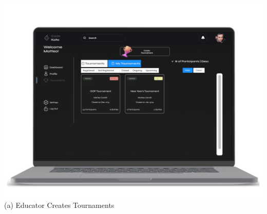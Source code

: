 \begin{center}
\includegraphics[scale=0.13]{Images/ui-ux/educator_create_tournament/educator_create_tournament_4.png}
        (a) Educator Creates Tournaments
\end{center}
